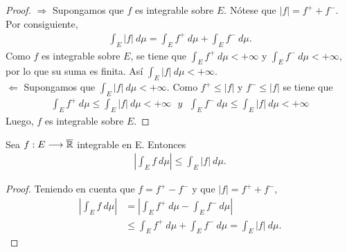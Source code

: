 \begin{proof}
$\Longrightarrow$ Supongamos que $f$ es integrable sobre $E$. Nótese que $|f| = f^+ + f^-$. Por consiguiente,
\begin{align*}
    \int_{E}{|f| \ d\mu} = \int_{E}{f^+  \ d\mu} + \int_{E}{f^-  \ d\mu}.
\end{align*}
Como $f$ es integrable sobre $E$, se tiene que $\int_{E}{f^+  \ d\mu} < +\infty$ y $\int_{E}{f^-  \ d\mu} < +\infty$, por lo que su suma es finita. Así $\int_{E}{|f|  \ d\mu} < +\infty$.
\\
\newline
$\Longleftarrow$ Supongamos que $\int_{E}{|f| \ d\mu} < +\infty$. Como $f^+ \leq |f|$ y $f^- \leq |f|$ se tiene que
\begin{align*}
    \int_{E}{f^+ \ d\mu} \leq \int_{E}{|f| \ d\mu} < +\infty \ \ \ y \ \ \ \int_{E}{f^- \ d\mu} \leq \int_{E}{|f| \ d\mu} < +\infty 
\end{align*}
Luego, $f$ es integrable sobre $E$.
\end{proof}

\begin{prop}
Sea $f: E \longrightarrow \overline{\mathbb{R}}$ integrable en E. Entonces
\begin{align*}
    \left| \int_{E}{f \ d\mu} \right| \leq \int_{E}{|f| \ d\mu}.
\end{align*}
\end{prop}

\begin{proof}
Teniendo en cuenta  que $f = f^+ - f^-$ y que $|f| = f^+ + f^-$,
\begin{align*}
    \left| \int_{E}{f \ d\mu}\right| &= \left| \int_{E}{f^+ \ d\mu} - \int_{E}{f^- \ d\mu}\right|\\
    &\leq \int_{E}{f^+ \ d\mu} + \int_{E}{f^- \ d\mu} = \int_{E}{|f| \ d\mu}.
\end{align*}
\end{proof}

